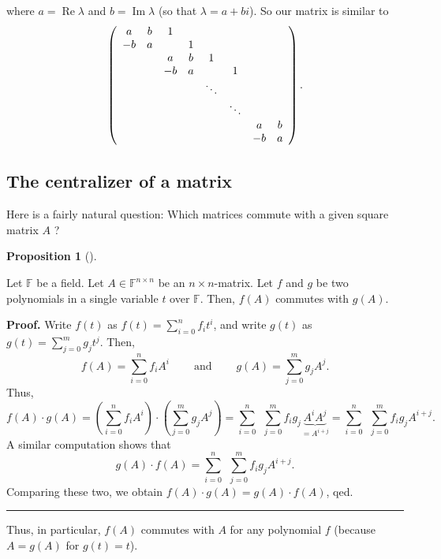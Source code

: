 \documentclass[numbers=enddot,12pt,final,onecolumn,notitlepage]{scrartcl}%
\numberwithin{exer}{subsection}
\theoremstyle{definition}
\newtheorem{prop}[theo]{Proposition}
\newenvironment{proposition}[1][]
{\begin{prop}[#1]\begin{leftbar}}
{\end{leftbar}\end{prop}}
\newenvironment{proof}[1][Proof]{\noindent\textbf{#1.} }{\ \rule{0.5em}{0.5em}}
\let\sumnonlimits\sum
\renewcommand{\sum}{\sumnonlimits\limits}
\begin{document}
where $a=\operatorname*{Re}\lambda$ and $b=\operatorname*{Im}\lambda$ (so that
$\lambda=a+bi$). So our matrix is similar to%
\[
\left(
\begin{array}
[c]{cccccccc}%
a & b & 1 &  &  &  &  & \\
-b & a &  & 1 &  &  &  & \\
&  & a & b & 1 &  &  & \\
&  & -b & a &  & 1 &  & \\
&  &  &  & \ddots &  &  & \\
&  &  &  &  & \ddots &  & \\
&  &  &  &  &  & a & b\\
&  &  &  &  &  & -b & a
\end{array}
\right)  .
\]


\subsection{The centralizer of a matrix}

Here is a fairly natural question: Which matrices commute with a given square
matrix $A$ ?

\begin{proposition}
Let $\mathbb{F}$ be a field. Let $A\in\mathbb{F}^{n\times n}$ be an $n\times
n$-matrix. Let $f$ and $g$ be two polynomials in a single variable $t$ over
$\mathbb{F}$. Then, $f\left(  A\right)  $ commutes with $g\left(  A\right)  $.
\end{proposition}

\begin{proof}
Write $f\left(  t\right)  $ as $f\left(  t\right)  =\sum_{i=0}^{n}f_{i}t^{i}$,
and write $g\left(  t\right)  $ as $g\left(  t\right)  =\sum_{j=0}^{m}%
g_{j}t^{j}$. Then,%
\[
f\left(  A\right)  =\sum_{i=0}^{n}f_{i}A^{i}\ \ \ \ \ \ \ \ \ \ \text{and}%
\ \ \ \ \ \ \ \ \ \ g\left(  A\right)  =\sum_{j=0}^{m}g_{j}A^{j}.
\]
Thus,%
\[
f\left(  A\right)  \cdot g\left(  A\right)  =\left(  \sum_{i=0}^{n}f_{i}%
A^{i}\right)  \cdot\left(  \sum_{j=0}^{m}g_{j}A^{j}\right)  =\sum_{i=0}%
^{n}\ \ \sum_{j=0}^{m}f_{i}g_{j}\underbrace{A^{i}A^{j}}_{=A^{i+j}}=\sum
_{i=0}^{n}\ \ \sum_{j=0}^{m}f_{i}g_{j}A^{i+j}.
\]
A similar computation shows that%
\[
g\left(  A\right)  \cdot f\left(  A\right)  =\sum_{i=0}^{n}\ \ \sum_{j=0}%
^{m}f_{i}g_{j}A^{i+j}.
\]
Comparing these two, we obtain $f\left(  A\right)  \cdot g\left(  A\right)
=g\left(  A\right)  \cdot f\left(  A\right)  $, qed.
\end{proof}

Thus, in particular, $f\left(  A\right)  $ commutes with $A$ for any
polynomial $f$ (because $A=g\left(  A\right)  $ for $g\left(  t\right)  =t$).
\end{document}

